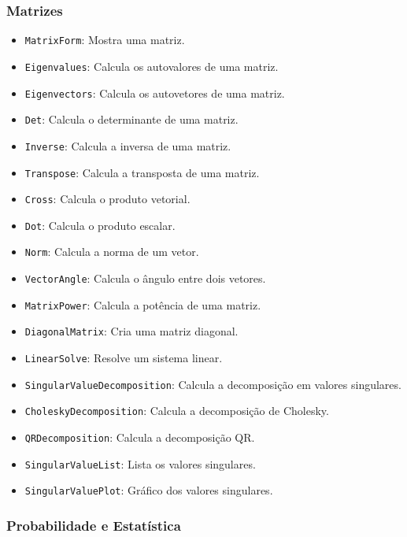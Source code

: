 \documentclass[a4paper, 12pt]{article}
\begin{document}
\subsubsection{Matrizes}\label{matrizes}

\begin{itemize}
    \item \texttt{MatrixForm}: Mostra uma matriz.
    \item \texttt{Eigenvalues}: Calcula os autovalores de uma matriz.
    \item \texttt{Eigenvectors}: Calcula os autovetores de uma matriz.
    \item \texttt{Det}: Calcula o determinante de uma matriz.
    \item \texttt{Inverse}: Calcula a inversa de uma matriz.
    \item \texttt{Transpose}: Calcula a transposta de uma matriz.
    \item \texttt{Cross}: Calcula o produto vetorial.
    \item \texttt{Dot}: Calcula o produto escalar.
    \item \texttt{Norm}: Calcula a norma de um vetor.
    \item \texttt{VectorAngle}: Calcula o ângulo entre dois vetores.
    \item \texttt{MatrixPower}: Calcula a potência de uma matriz.
    \item \texttt{DiagonalMatrix}: Cria uma matriz diagonal.
    \item \texttt{LinearSolve}: Resolve um sistema linear.
    \item \texttt{SingularValueDecomposition}: Calcula a decomposição em valores singulares.
    \item \texttt{CholeskyDecomposition}: Calcula a decomposição de Cholesky.
    \item \texttt{QRDecomposition}: Calcula a decomposição QR.
    \item \texttt{SingularValueList}: Lista os valores singulares.
    \item \texttt{SingularValuePlot}: Gráfico dos valores singulares.
\end{itemize}

\subsubsection{Probabilidade e Estatística}\label{probabilidade-e-estatistica}
\end{document}
